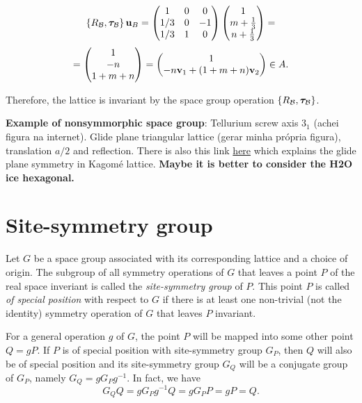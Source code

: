 $$
\{R_{\mathcal{B}}, {\bm{\tau}}_{\mathcal{B}}\} \, {\vb{u}}_B =
\begin{pmatrix}
1 & 0 & 0 \\
1/3 & 0 & -1 \\
1/3 & 1 & 0 \\
\end{pmatrix}
\begin{pmatrix}
1 \\ m + \frac{1}{3} \\ n + \frac{1}{3}
\end{pmatrix}
=
$$
$$
=
\begin{pmatrix}
1 \\ -n \\ 1+m+n
\end{pmatrix}
=
\begin{pmatrix}
1 \\ -n {\vb{v}}_1 + (1+m+n) {\vb{v}}_2
\end{pmatrix}
\in A.
$$

Therefore, the lattice is invariant by the space group operation $\{R_{\mathcal{B}}, {\bm{\tau}}_{\mathcal{B}}\}$.

\n

\textbf{Example of nonsymmorphic space group}: Tellurium screw axis $3_1$ (achei figura na internet). Glide plane triangular lattice (gerar minha própria figura), translation $a/2$ and reflection. There is also this link \href{https://physics.stackexchange.com/questions/568476/example-of-a-space-group-which-does-not-contain-the-point-group-as-a-subgroup}{here} which explains the glide plane symmetry in Kagomé lattice. \textbf{Maybe it is better to consider the H2O ice hexagonal.}

\section{Site-symmetry group}

Let $G$ be a space group associated with its corresponding lattice and a choice of origin. The subgroup of all symmetry operations of $G$ that leaves a point $P$ of the real space inveriant is called the \textit{site-symmetry group} of $P$. This point $P$ is called \textit{of special position} with respect to $G$ if there is at least one non-trivial (not the identity) symmetry operation of $G$ that leaves $P$ invariant.

For a general operation $g$ of $G$, the point $P$ will be mapped into some other point $Q = g P$. If $P$ is of special position with site-symmetry group $G_P$, then $Q$ will also be of special position and its site-symmetry group $G_Q$ will be a conjugate group of $G_P$, namely $G_Q = g G_P g^{-1}$. In fact, we have
$$
G_Q Q = g G_P g^{-1} Q = g G_P P = g P = Q.
$$

